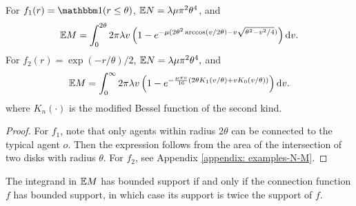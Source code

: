    
\begin{corollary}
\label{cor: examples-N-M}
 For $f_1(r)= \ind{(r\leq \theta)}$, $\mathbb{E} N = \lambda\mu\pi^2\theta^4$, and 
 \begin{equation}
        \mathbb{E} M 
         = \int_{0}^{2\theta}2\pi\lambda v\left(1-e^{-\mu (2\theta^2\arccos(v/2\theta)-v\sqrt{\theta^2-v^2/4})}\right)\mathrm{d} v.
        \label{eq: E M_0 disk}
\end{equation}
For $f_2(r)= \exp(-r/\theta)/2$,  $\mathbb{E} N = {\lambda\mu\pi^2}{\theta^4},$
and
\begin{align}
        \mathbb{E} M = \int_{0}^{\infty}2\pi\lambda v\left(1-e^{-\frac{\mu\pi v}{16}{({2\theta K_1(v/\theta)}+vK_0(v/\theta)})}\right)\mathrm{d} v.\label{eq: E M_0 exp}
        \end{align}
where $K_n(\cdot)$ is the modified Bessel function of the second kind.



 
\end{corollary}    
\begin{proof}
For $f_1$, note that only agents within radius $2\theta$ can be connected to the typical agent $o$. Then the expression follows from the area of the intersection of two disks with radius $\theta$. For $f_2$, see Appendix \ref{appendix: examples-N-M}. 
\end{proof}
\begin{remark}
The integrand in $\mathbb{E} M$ has bounded support if and only if the connection function $f$ has bounded support, in which case its support is twice the support of $f$. 
\end{remark}

